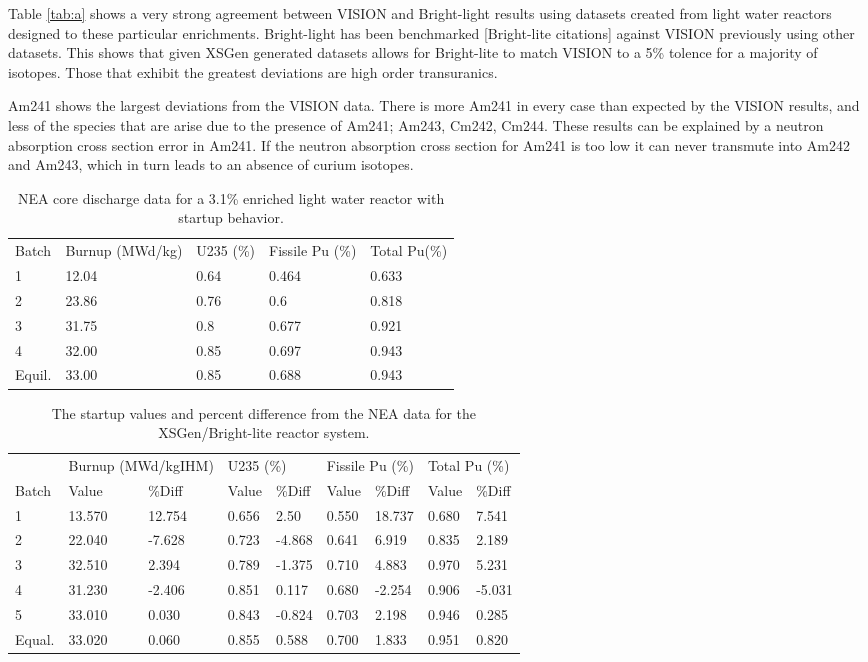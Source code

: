 \documentclass{article}
\begin{document}
Table \ref{tab:a} shows a very strong agreement between VISION and Bright-light results using datasets created from light water reactors designed to these particular enrichments. Bright-light has been benchmarked [Bright-lite citations] against VISION previously using other datasets. This shows that given XSGen generated datasets allows for Bright-lite to match VISION to a 5\% tolence for a majority of isotopes. Those that exhibit the greatest deviations are high order transuranics. 

Am241 shows the largest deviations from the VISION data. There is more Am241 in every case than expected by the VISION results, and less of the species that are arise due to the presence of Am241; Am243, Cm242, Cm244. These results can be explained by a neutron absorption cross section error in Am241. If the neutron absorption cross section for Am241 is too low it can never transmute into Am242 and Am243, which in turn leads to an absence of curium isotopes. 

\begin{table}[!htb]
\centering
\caption{NEA core discharge data for a 3.1\% enriched light water reactor with startup behavior.}
\label{tab:b}
\begin{tabular}{lllll}
Batch & Burnup (MWd/kg) & U235 (\%) & Fissile Pu (\%) & Total Pu(\%) \\
1 & 12.04 & 0.64 & 0.464 & 0.633 \\
2 & 23.86 & 0.76 & 0.6 & 0.818 \\
3 & 31.75 & 0.8 & 0.677 & 0.921 \\
4 & 32.00 & 0.85 & 0.697 & 0.943 \\
Equil. & 33.00 & 0.85 & 0.688 & 0.943
\end{tabular}
\end{table}

\begin{table}[!htb]
\centering
\caption{The startup values and percent difference from the NEA data for the XSGen/Bright-lite reactor system.}
\label{tab:c}
\begin{tabular}{lllllllll}
 & \multicolumn{2}{l}{Burnup (MWd/kgIHM)} & \multicolumn{2}{l}{U235 (\%)} & \multicolumn{2}{l}{Fissile Pu (\%)} & \multicolumn{2}{l}{Total Pu (\%)} \\
Batch & Value & \%Diff & Value & \%Diff & Value & \%Diff & Value & \%Diff \\
1 & 13.570 & 12.754 & 0.656 & 2.50 & 0.550 & 18.737 & 0.680 & 7.541 \\
2 & 22.040 & -7.628 & 0.723 & -4.868 & 0.641 & 6.919 & 0.835 & 2.189 \\
3 & 32.510 & 2.394 & 0.789 & -1.375 & 0.710 & 4.883 & 0.970 & 5.231 \\
4 & 31.230 & -2.406 & 0.851 & 0.117 & 0.680 & -2.254 & 0.906 & -5.031 \\
5 & 33.010 & 0.030 & 0.843 & -0.824 & 0.703 & 2.198 & 0.946 & 0.285 \\
Equal. & 33.020 & 0.060 & 0.855 & 0.588 & 0.700 & 1.833 & 0.951 & 0.820
\end{tabular}
\end{table}
\end{document}
